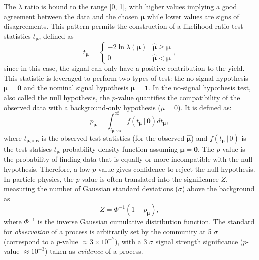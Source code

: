 The $\lambda$ ratio is bound to the range [0, 1], with higher values implying a good agreement between the data and the chosen $\boldsymbol{\mu}$ while lower values are signs of disagreements. This pattern permits the construction of a likelihood ratio test statistics $t_{\boldsymbol{\mu}}$, defined as \cite{asympForm}
\begin{equation}\label{eq-lik-ratio-test}
    t_{\boldsymbol{\mu}} =
      \begin{cases}
        -2 \ln \lambda(\boldsymbol{\mu}) & \hat{\boldsymbol{\mu}} \geq \boldsymbol{\mu} \\
        0 & \hat{\boldsymbol{\mu}} < \boldsymbol{\mu}
      \end{cases},
\end{equation}
since in this case, the signal can only have a positive contribution to the yield. This statistic is leveraged to perform two types of test: the no signal hypothesis $\boldsymbol{\mu} = \boldsymbol{0}$ and the nominal signal hypothesis $\boldsymbol{\mu} = \boldsymbol{1}$. In the no-signal hypothesis test, also called the null hypothesis, the $p$-value quantifies the compatibility of the observed data with a background-only hypothesis ($\mu = 0$). It is defined as:
\begin{equation}
    p_{\boldsymbol{\mu}}=\int_{t_{\boldsymbol{\mu},\mathrm{obs}}}^{\infty} f(t_{\boldsymbol{\mu}} \,| \, \boldsymbol{0}) dt_{\boldsymbol{\mu}},
\end{equation}
where $t_{\boldsymbol{\mu},\mathrm{obs}}$ is the observed test statistics (for the observed $\hat{\boldsymbol{\mu}}$) and $f(t_{\boldsymbol{\mu}} \,| \,0)$ is the test statiscs $t_{\boldsymbol{\mu}}$ probability density function assuming $\boldsymbol{\mu} = \boldsymbol{0}$. The $p$-value is the probability of finding data that is equally or more incompatible with the null hypothesis. Therefore, a low $p$-value gives confidence to reject the null hypothesis. In particle physics, the $p$-value is often translated into the significance $Z$, measuring the number of Gaussian standard deviations ($\sigma$) above the background as
\begin{equation}
    Z = \Phi^{-1}(1-p_{\boldsymbol{\mu}}),
\end{equation}
where $\Phi^{-1}$ is the inverse Gaussian cumulative distribution function. The standard for \textit{observation} of a process is arbitrarily set by the community at 5 $\sigma$ (correspond to a $p$-value $\approx 3 \times 10^{-7}$), with a 3 $\sigma$ signal strength significance ($p$-value $\approx 10^{-3}$) taken as \textit{evidence} of a process.  \\

